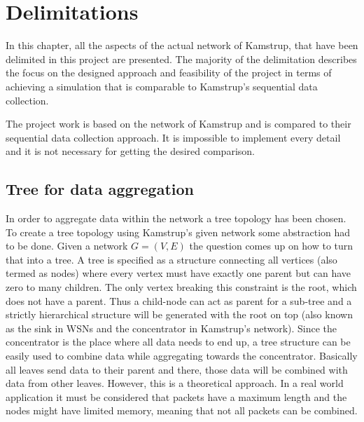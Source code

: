 \chapter{Delimitations}
\label{sec:delimitations}
In this chapter, all the aspects of the actual network of Kamstrup, that have been delimited in this project are presented. The majority of the delimitation describes the focus on the designed approach and feasibility of the project in terms of achieving a simulation that is comparable to Kamstrup's sequential data collection.

The project work is based on the network of Kamstrup and is compared to their sequential data collection approach. It is impossible to implement every detail and it is not necessary for getting the desired comparison.


\section{Tree for data aggregation}
In order to aggregate data within the network a tree topology has been chosen. To create a tree topology using Kamstrup's given network some abstraction had to be done. Given a network $G=(V,E)$ the question comes up on how to turn that into a tree. A tree is specified as a structure connecting all vertices (also termed as nodes) where every vertex must have exactly one parent but can have zero to many children. The only vertex breaking this constraint is the root, which does not have a parent. Thus a child-node can act as parent for a sub-tree and a strictly hierarchical structure will be generated with the root on top (also known as the sink in WSNs and the concentrator in Kamstrup's network). Since the concentrator is the place where all data needs to end up, a tree structure can be easily used to combine data while aggregating towards the concentrator. Basically all leaves send data to their parent and there, those data will be combined with data from other leaves. However, this is a theoretical approach. In a real world application it must be considered that packets have a maximum length and the nodes might have limited memory, meaning that not all packets can be combined.


